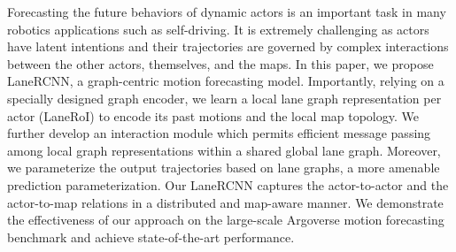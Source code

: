 Forecasting the future behaviors of dynamic actors is an important task in many robotics
applications such as self-driving.  
It is extremely challenging as actors have latent intentions 
and their trajectories are governed by complex interactions between the other actors,
themselves, and the maps.
In this paper, we propose LaneRCNN, 
a graph-centric motion forecasting model.
Importantly, relying on a specially designed graph encoder, we learn a local
lane graph representation per actor (LaneRoI) to encode its past motions and the local map topology.
We further develop an interaction module which permits efficient message
passing among local graph representations within a shared global lane graph.
Moreover, we parameterize the output trajectories based on lane graphs, a more amenable prediction parameterization.
Our LaneRCNN captures the actor-to-actor and the actor-to-map relations in a distributed and map-aware manner.
We demonstrate the effectiveness of our approach on the large-scale Argoverse motion
forecasting benchmark and achieve state-of-the-art performance.

